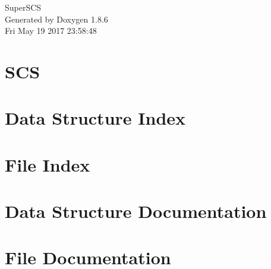 \documentclass[twoside]{book}
\newcommand{\clearemptydoublepage}{%
  \newpage{\pagestyle{empty}\cleardoublepage}%
}
\begin{document}
\hypersetup{pageanchor=false}
\begin{titlepage}
\vspace*{7cm}
\begin{center}%
{\Large Super\-S\-C\-S }\\
\vspace*{1cm}
{\large Generated by Doxygen 1.8.6}\\
\vspace*{0.5cm}
{\small Fri May 19 2017 23:58:48}\\
\end{center}
\end{titlepage}
\clearemptydoublepage
\tableofcontents
\clearemptydoublepage
{}
\hypersetup{pageanchor=true}

\chapter{S\-C\-S}
\label{md__r_e_a_d_m_e}
\hypertarget{md__r_e_a_d_m_e}{}

\chapter{Data Structure Index}

\chapter{File Index}

\chapter{Data Structure Documentation}












\chapter{File Documentation}






















\newpage
{}
{}
\printindex
\end{document}
